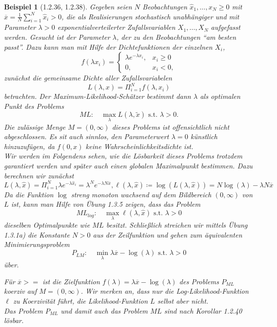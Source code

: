 \documentclass[12pt]{extreport} %
\theoremstyle{named}
\theoremstyle{nnamed}
\theoremstyle{itshape}
\theoremstyle{normal}
\newtheorem*{beispiel}{Beispiel}
\begin{document}
\begin{beispiel}[1.2.36, 1.2.38]
	Gegeben seien $N$ Beobachtungen $\hat{x}_1, \dotsc, \hat{x}_N \geq 0$ mit $\overline{x} = \frac{1}{N} \sum_{i=1}^{N} \hat{x}_i > 0$, die als Realisierungen stochastisch unabhängiger und mit Parameter $\lambda > 0$ exponentialverteilerter Zufallsvariablen $X_1, \dotsc, X_N$ aufgefasst werden. Gesucht ist der Parameter $\lambda$, der zu den Beobachtungen \enquote{am besten passt}. Dazu kann man mit Hilfe der Dichtefunktionen der einzelnen $X_i$,
	$$ f(\lambda x_i) = \begin{cases}
		\lambda e^{-\lambda x_i}, & x_i \geq 0 \\ 0, & x_i < 0,
	\end{cases} $$
	zunächst die gemeinsame Dichte aller Zufallsvariabelen
	$$ L(\lambda, x) = \Pi_{i=1}^{N} f(\lambda, x_i) $$
	betrachten. Der Maximum-Likelihood-Schätzer bestimmt dann $\lambda$ als optimalen Punkt des Problems
	$$ ML: \quad \max_{\lambda} L(\lambda, \tilde{x}) \text{ s.t. } \lambda > 0. $$
	Die zulässige Menge $M = (0, \infty)$ dieses Problems ist offensichtlich nicht abgeschlossen. Es sit auch sinnlos, den Parameterwert $\lambda = 0$ künstlich hinzuzufügen, da $f(0, x)$ keine Wahrscheinlichkeitsdichte ist. ~\\
	
	Wir werden im Folgendens sehen, wie die Lösbarkeit dieses Problems trotzdem garantiert werden und später auch einen globalen Maximalpunkt bestimmen. Dazu berechnen wir zunächst
	$$ L(\lambda, \hat{x}) = \Pi_{i=1}^{N} \lambda e^{-\lambda \hat{x}_i} = \lambda^N e^{-\lambda N \overline{x}}, \ell(\lambda, \hat{x}) \coloneqq \log(L(\lambda, \hat{x})) = N \log(\lambda) - \lambda N \overline{x} $$
	Da die Funktion $\log$ streng monoton wachsend auf dem Bildbereich $(0, \infty)$ von $L$ ist, kann man Hilfe von Übung 1.3.5 zeigen, dass das Problem
	$$ ML_{log}: \quad \max_\lambda \ell(\lambda, \hat{x}) \text{ s.t. } \lambda > 0 $$
	dieselben Optimalpunkte wie $ML$ besitzt. Schließlich streichen wir mittels Übung 1.3.1a) die Konstante $N > 0$ aus der Zeilfunktion und gehen zum äquivalenten Minimierungsproblem
	$$ P_{LM}: \quad \min_\lambda \lambda \overline{x} - \log(\lambda) \text{ s.t. } \lambda > 0 $$
	über.
	

	Für $\overline{x} > =$ ist die Zielfunktion $f(\lambda) = \lambda \overline{x} - \log(\lambda)$ des Problems $P_{ML}$ koerziv auf $M = (0, \infty)$. Wir merken an, dass nur die Log-Likelihood-Funktion $\ell$ zu Koerzivität führt, die Likelihood-Funktion $L$ selbst aber nicht. ~\\
	
	Das Problem $P_{ML}$ und damit auch das Problem $ML$ sind nach Korollar 1.2.40 lösbar.
\end{beispiel}
\end{document}
